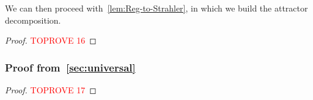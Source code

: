 \documentclass[a4paper,UKenglish,cleveref, autoref, thm-restate]{lipics-v2021}
\begin{document}
We can then proceed with~\cref{lem:Reg-to-Strahler}, in which we build the attractor decomposition.

\propRegToStrahler*


\begin{proof}\textcolor{red}{TOPROVE 16}\end{proof}

\subsubsection{Proof from~\cref{sec:universal}}\label{app:Strahler-to-Reg}

\strahlerToReg*

\begin{proof}\textcolor{red}{TOPROVE 17}\end{proof} 
\end{document}
